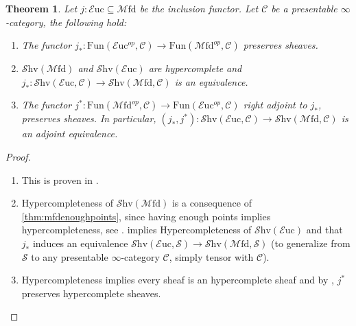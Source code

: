 \documentclass[10pt]{amsart}
\newcommand{\C}{\mathscr{C}}
\newcommand{\s}{\mathscr{S}}
\newcommand{\Fun}{\mathrm{Fun}}
\newcommand{\Euc}{\mathscr{E}\mathrm{uc}}
\newcommand{\Mfd}{\mathscr{M}\mathrm{fd}}
\newcommand{\Shv}{\mathscr{S}\mathrm{hv}}
\newtheorem{theorem}[equation]{Theorem}
\theoremstyle{definition}
\theoremstyle{remark}
\newtheorem{remark}[equation]{Remark}
\numberwithin{equation}{section}
\begin{document}
\begin{theorem}
Let $j:\Euc\subseteq\Mfd$ be the inclusion functor. Let $\C$ be a presentable $\infty$-category, the following hold:
\begin{enumerate}
	\item The functor $j_*:\Fun(\Euc^{op},\C)\to\Fun(\Mfd^{op},\C)$ preserves sheaves. 
	\item $\Shv(\Mfd)$ and $\Shv(\Euc)$ are hypercomplete and $j_*:\Shv(\Euc,\C)\to\Shv(\Mfd,\C)$ is an equivalence. 
	\item The functor $j^*:\Fun(\Mfd^{op},\C)\to\Fun(\Euc^{op},\C)$ right adjoint to $j_*$, preserves sheaves. In particular, $(j_*,j^*):\Shv(\Euc,\C)\to\Shv(\Mfd,\C)$ is an adjoint equivalence.
\end{enumerate}
\end{theorem}
\begin{proof}
	\begin{enumerate}
		\item This is proven in \cite[Lemma 3.12.7]{barwick2020exodromy}.
		\item Hypercompleteness of $\Shv(\Mfd)$ is a consequence of \cref{thm:mfdenoughpoints}, since having enough points implies hypercompleteness, see \cite[Example 3.11.10]{barwick2020exodromy}. \cite[Corollary 3.12.13]{barwick2020exodromy} implies Hypercompleteness of $\Shv(\Euc)$ and that $j_*$ induces an equivalence $\Shv(\Euc,\s)\to\Shv(\Mfd,\s)$ (to generalize from $\s$ to any presentable $\infty$-category $\C$, simply tensor with $\C$).
		\item Hypercompleteness implies every sheaf is an hypercomplete sheaf and by \cite[Proposition 3.12.11]{barwick2020exodromy}, $j^*$ preserves hypercomplete sheaves. 
	\end{enumerate}
\end{proof}


{\footnotesize


}
\end{document}

